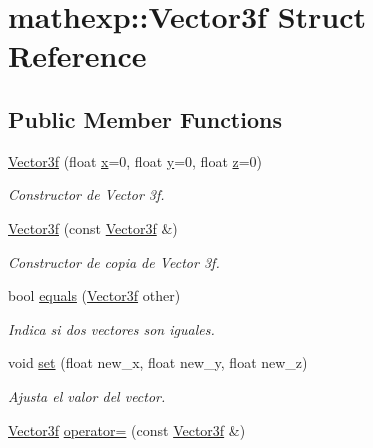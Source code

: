 \hypertarget{structmathexp_1_1_vector3f}{}\section{mathexp\+::Vector3f Struct Reference}
\label{structmathexp_1_1_vector3f}
\subsection*{Public Member Functions}
\begin{DoxyCompactItemize}
\item 
\mbox{\hyperlink{structmathexp_1_1_vector3f_a07228ea1dee8b94ff864e30343fe790a}{Vector3f}} (float \mbox{\hyperlink{structmathexp_1_1_vector3f_ab36656a53e2a829b9c1950b5d7b5cdc6}{x}}=0, float \mbox{\hyperlink{structmathexp_1_1_vector3f_a7f4643d6f1cb1ab4d8743ae185a66382}{y}}=0, float \mbox{\hyperlink{structmathexp_1_1_vector3f_a56035190b1b08940cd7cefe3fb41319b}{z}}=0)
\begin{DoxyCompactList}\small\item\em Constructor de Vector 3f. \end{DoxyCompactList}\item 
\mbox{\hyperlink{structmathexp_1_1_vector3f_a710d37b97baa155479ee78550f818532}{Vector3f}} (const \mbox{\hyperlink{structmathexp_1_1_vector3f}{Vector3f}} \&)
\begin{DoxyCompactList}\small\item\em Constructor de copia de Vector 3f. \end{DoxyCompactList}\item 
bool \mbox{\hyperlink{structmathexp_1_1_vector3f_abe13c491522e0f078b54b12887b7d3c7}{equals}} (\mbox{\hyperlink{structmathexp_1_1_vector3f}{Vector3f}} other)
\begin{DoxyCompactList}\small\item\em Indica si dos vectores son iguales. \end{DoxyCompactList}\item 
void \mbox{\hyperlink{structmathexp_1_1_vector3f_a38da84d6630cf7c31d32f1272d438b91}{set}} (float new\+\_\+x, float new\+\_\+y, float new\+\_\+z)
\begin{DoxyCompactList}\small\item\em Ajusta el valor del vector. \end{DoxyCompactList}\item 
\mbox{\hyperlink{structmathexp_1_1_vector3f}{Vector3f}} \mbox{\hyperlink{structmathexp_1_1_vector3f_a91fda351da88f23356789b42d62211e7}{operator=}} (const \mbox{\hyperlink{structmathexp_1_1_vector3f}{Vector3f}} \&)

\end{DoxyCompactItemize}
